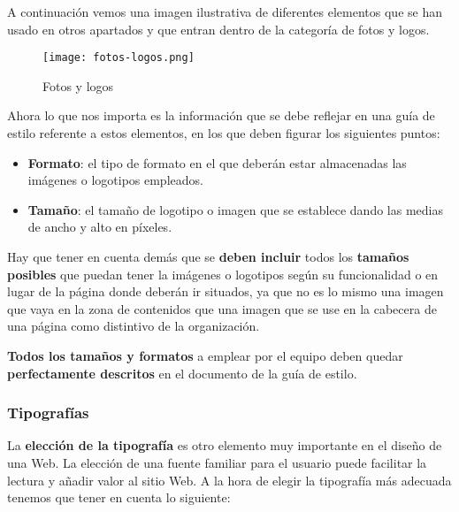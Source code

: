 A continuación vemos una imagen ilustrativa de diferentes elementos que se han usado en otros apartados y que entran dentro de la categoría de fotos y logos.

\begin{figure}[H]
    \centering
    \texttt{[image: fotos-logos.png]}
    \caption{Fotos y logos}
\end{figure}

Ahora lo que nos importa es la información que se debe reflejar en una guía de estilo referente a estos elementos, en los que deben figurar los siguientes puntos:

\begin{itemize}
    \item \textbf{Formato}: el tipo de formato en el que deberán estar almacenadas las imágenes o logotipos empleados.
    \item \textbf{Tamaño}: el tamaño de logotipo o imagen que se establece dando las medias de ancho y alto en píxeles.
\end{itemize}

Hay que tener en cuenta demás que se \textbf{deben incluir} todos los \textbf{tamaños posibles} que puedan tener la imágenes o logotipos según su funcionalidad o en lugar de la página donde deberán ir situados, ya que no es lo mismo una imagen que vaya en la zona de contenidos que una imagen que se use en la cabecera de una página como distintivo de la organización.

\textbf{Todos los tamaños y formatos} a emplear por el equipo deben quedar \textbf{perfectamente descritos} en el documento de la guía de estilo.

\subsubsection{Tipografías}
La \textbf{elección de la tipografía} es otro elemento muy importante en el diseño de una Web. La elección de una fuente familiar para el usuario puede facilitar la lectura y añadir valor al sitio Web.  A la hora de elegir la tipografía más adecuada tenemos que tener en cuenta lo siguiente:

